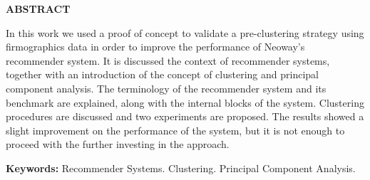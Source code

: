 \thispagestyle{plain}

\begin{center}
	\textbf{ABSTRACT}
\end{center}

\bigskip

In this work we used a proof of concept to validate a pre-clustering strategy using firmographics data in order to improve the performance of Neoway's recommender system. It is discussed the context of recommender systems, together with an introduction of the concept of clustering and principal component analysis. The terminology of the recommender system and its benchmark are explained, along with the internal blocks of the system. Clustering procedures are discussed and two experiments are proposed. The results showed a slight improvement on the performance of the system, but it is not enough to proceed with the further investing in the approach.

\textbf{Keywords:} Recommender Systems. Clustering. Principal Component Analysis.